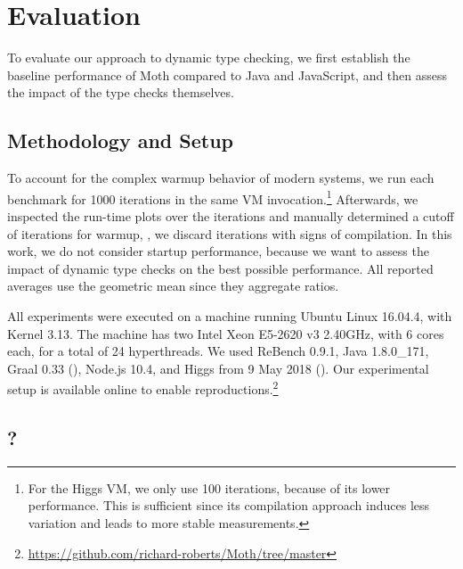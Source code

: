 
\section{Evaluation}
\label{sec:evaluation}

\newcommand{\NumIterationsAll}{1000\xspace}
\newcommand{\NumIterationsHiggs}{100\xspace}


To evaluate our approach to dynamic type checking,
we first establish the baseline performance of Moth
compared to Java and JavaScript,
and then assess the impact of the type checks themselves.

\subsection{Methodology and Setup}

To account for the complex warmup behavior
of modern systems\citep{Barrett:2017:VMW},
we run each benchmark for \NumIterationsAll iterations in the same
VM invocation.\footnote{
For the Higgs VM, we only use \NumIterationsHiggs iterations,
because of its lower performance.
This is sufficient since its compilation approach induces less variation
and leads to more stable measurements.}
Afterwards, we inspected the run-time plots over the iterations
and manually determined a cutoff of \WarmupCutOff iterations for warmup,
\ie, we discard iterations with signs of compilation.
In this work, we do not consider startup performance,
because we want to assess the impact of dynamic type checks
on the best possible performance.
All reported averages use the geometric mean since they aggregate ratios.

All experiments were executed on a machine running Ubuntu Linux 16.04.4,
with Kernel 3.13.
The machine has two Intel Xeon E5-2620 v3 2.40GHz,
with 6 cores each, for a total of 24 hyperthreads.
We used ReBench 0.9.1, Java 1.8.0\_171, Graal 0.33 (),
Node.js 10.4, and Higgs from 9 May 2018 ().
Our experimental setup is available online to enable reproductions.\footnote{
\url{https://github.com/richard-roberts/Moth/tree/master}}


\subsection{\AWFY?}
\label{sec:baseline-perf}


